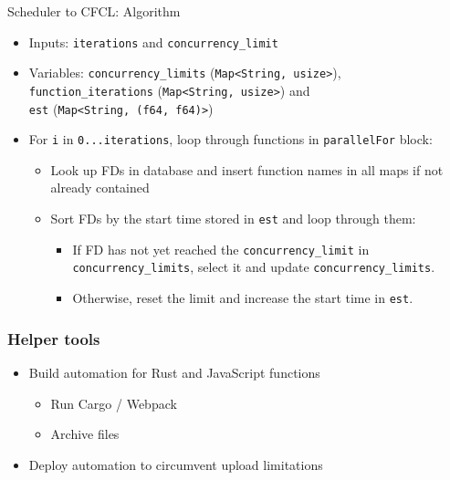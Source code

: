 \documentclass[11pt,t,usepdftitle=false,aspectratio=169]{beamer}
\begin{document}
\begin{frame}{Scheduler to CFCL: Algorithm}
  \begin{itemize}
    \item Inputs: \texttt{iterations} and \texttt{concurrency\_limit}
    \item Variables: \texttt{concurrency\_limits} (\texttt{Map<String, usize>}), \\ \texttt{function\_iterations} (\texttt{Map<String, usize>}) and \\ \texttt{est} (\texttt{Map<String, (f64, f64)>})
    \item For \texttt{i} in \texttt{0...iterations}, loop through functions in \texttt{parallelFor} block:
      \begin{itemize}
        \item Look up FDs in database and insert function names in all maps if not already contained
        \item Sort FDs by the start time stored in \texttt{est} and loop through them:
          \begin{itemize}
            \item If FD has not yet reached the \texttt{concurrency\_limit} in \texttt{concurrency\_limits}, select it and update \texttt{concurrency\_limits}.
            \item Otherwise, reset the limit and increase the start time in \texttt{est}.
          \end{itemize}
    \end{itemize}
  \end{itemize}
\end{frame}

\begin{frame}
\frametitle{Helper tools}
    \begin{itemize}
        \item Build automation for Rust and JavaScript functions
          \begin{itemize}
            \item Run Cargo / Webpack
            \item Archive files
          \end{itemize}
        \item Deploy automation to circumvent upload limitations
    \end{itemize}
    \vspace{1cm}
\end{frame}
\end{document}
